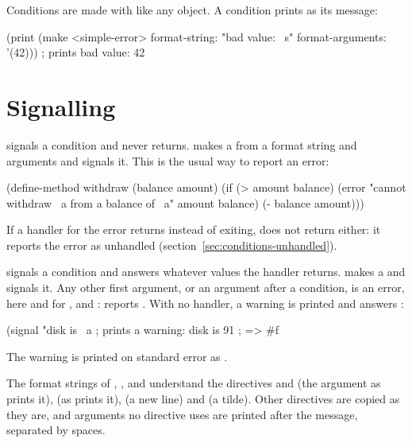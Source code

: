 \noindent Conditions are made with  like any object. A
condition prints as its message:

\begin{dylan}
(print (make <simple-error> format-string: "bad value: ~s"
                            format-arguments: '(42)))
; prints bad value: 42
\end{dylan}

\section{Signalling}\label{sec:conditions-signalling}

 signals a condition and never returns.
 makes a
 from a format string and arguments and signals it.
This is the usual way to report an error:

\begin{dylan}
(define-method withdraw (balance amount)
  (if (> amount balance)
      (error "cannot withdraw ~a from a balance of ~a" amount balance)
      (- balance amount)))
\end{dylan}

\noindent If a handler for the error returns instead of exiting,
 does not return either: it reports the error as unhandled
(section~\ref{sec:conditions-unhandled}).

 signals a condition and answers whatever
values the handler returns.  makes a  and signals it. Any other first
argument, or an argument after a condition, is an error, here and for
,  and :
 reports .
With no handler, a warning is printed and  answers
:

\begin{dylan}
(signal "disk is ~a%
; prints a warning:  disk is 91%
; => #f
\end{dylan}

\noindent The warning is printed on standard error as
.

The format strings of , ,  and
 understand the directives  and
 (the argument as  prints it),
 (as  prints it),
\code{\textasciitilde{}\%} (a new line) and \code{\textasciitilde{}\textasciitilde{}}
(a tilde). Other directives are copied as they are, and arguments no
directive uses are printed after the message, separated by spaces.

